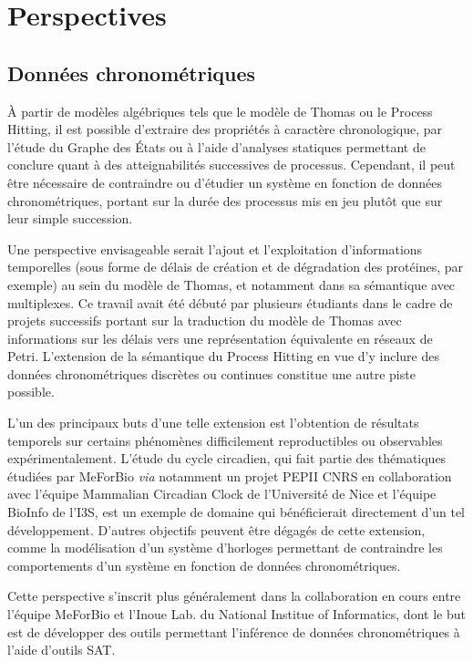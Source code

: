 \chapter{Perspectives}
\label{chap:perspectives}

\section{Données chronométriques}

À partir de modèles algébriques tels que le modèle de Thomas ou le Process Hitting, il est possible d'extraire des propriétés à caractère chronologique,
par l'étude du Graphe des États ou à l'aide d'analyses statiques permettant de conclure quant à des atteignabilités successives de processus.
Cependant, il peut être nécessaire de contraindre ou d'étudier un système en fonction de données chronométriques, portant sur la durée des processus mis en jeu plutôt que sur leur simple succession.

Une perspective envisageable serait l'ajout et l'exploitation d'informations temporelles (sous forme de délais de création et de dégradation des protéines, par exemple) au sein du modèle de Thomas, et notamment dans sa sémantique avec multiplexes.
Ce travail avait été débuté par plusieurs étudiants dans le cadre de projets successifs portant sur la traduction du modèle de Thomas avec informations sur les délais vers une représentation équivalente en réseaux de Petri.
L'extension de la sémantique du Process Hitting en vue d'y inclure des données chronométriques discrètes ou continues constitue une autre piste possible.

L'un des principaux buts d'une telle extension est l'obtention de résultats temporels sur certains phénomènes difficilement reproductibles ou observables expérimentalement.
L'étude du cycle circadien, qui fait partie des thématiques étudiées par MeForBio \textit{via} notamment un projet PEPII CNRS en collaboration avec l'équipe Mammalian Circadian Clock de l'Université de Nice et l'équipe BioInfo de l'I3S, est un exemple de domaine qui bénéficierait directement d'un tel développement.
D'autres objectifs peuvent être dégagés de cette extension, comme la modélisation d'un système d'horloges permettant de contraindre les comportements d'un système en fonction de données chronométriques.

Cette perspective s'inscrit plus généralement dans la collaboration en cours entre l'équipe MeForBio et l'Inoue Lab. du National Institue of Informatics,
dont le but est de développer des outils permettant l'inférence de données chronométriques à l'aide d'outils SAT.



